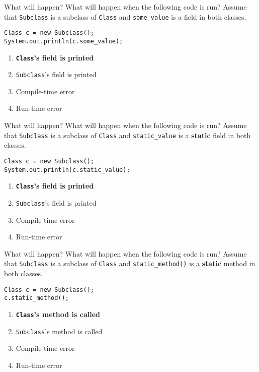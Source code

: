\documentclass[9pt]{beamer}
\begin{document}
 
\begin{frame}[fragile]{What will happen?}
  What will happen when the following code is run? Assume that {\tt Subclass} is
  a subclass of {\tt Class} and {\tt some\_value} is a field in both classes.
  \begin{lstlisting}
Class c = new Subclass();
System.out.println(c.some_value);
  \end{lstlisting}
  \begin{enumerate}
    \item
      \textbf<2>{{\tt Class}'s field is printed}
    \item
      {\tt Subclass}'s field is printed
    \item
      Compile-time error
    \item
      Run-time error
  \end{enumerate}
\end{frame} 


\begin{frame}[fragile]{What will happen?}
  What will happen when the following code is run? Assume that {\tt Subclass} is
  a subclass of {\tt Class} and {\tt static\_value} is a {\bf static} field in
  both classes.
  \begin{lstlisting}
Class c = new Subclass();
System.out.println(c.static_value);
  \end{lstlisting}
  \begin{enumerate}
    \item
      \textbf<2>{{\tt Class}'s field is printed}
    \item
      {\tt Subclass}'s field is printed
    \item
      Compile-time error
    \item
      Run-time error
  \end{enumerate}
\end{frame} 


\begin{frame}[fragile]{What will happen?}
  What will happen when the following code is run? Assume that {\tt Subclass} is
  a subclass of {\tt Class} and {\tt static\_method()} is a {\bf static} method
  in both classes.
  \begin{lstlisting}
Class c = new Subclass();
c.static_method();
  \end{lstlisting}
  \begin{enumerate}
    \item
      \textbf<2>{{\tt Class}'s method is called}
    \item
      {\tt Subclass}'s method is called
    \item
      Compile-time error
    \item
      Run-time error
  \end{enumerate}
\end{frame} 
\end{document}
